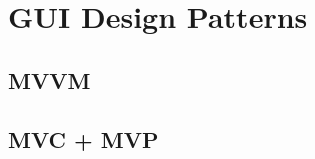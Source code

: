 \documentclass[../report.tex]{subfiles}
\begin{document}
\section{GUI Design Patterns}
\subsection{MVVM}
\subsection{MVC + MVP}
\end{document}
